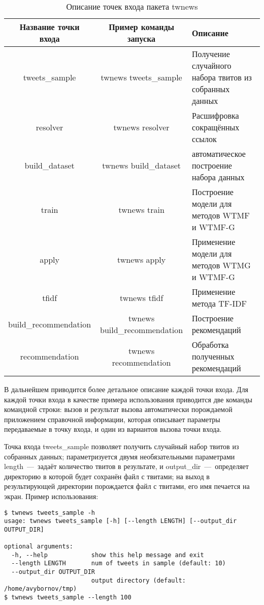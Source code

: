          \begin{table}[h!]
            \small
            \caption{Описание точек входа пакета twnews \bigskip}
            \center

            \label{tabular:entry_point}
            \begin{tabular}{|c|c|m{7cm}|}
                \hline
                \bf{Название точки входа} & \bf{Пример команды запуска} & \bf{Описание} \\ \hline
                tweets\_sample & twnews tweets\_sample & Получение случайного набора твитов из собранных данных \\ \hline
                resolver & twnews resolver & Расшифровка сокращённых ссылок \\ \hline
                build\_dataset & twnews build\_dataset & автоматическое построение набора данных \\ \hline
                train & twnews train & Построение модели для методов WTMF и WTMF-G \\ \hline
                apply & twnews apply & Применение модели для методов WTMG и WTMF-G \\ \hline
                tfidf & twnews tfidf & Применение метода TF-IDF \\ \hline
                build\_recommendation & twnews build\_recommendation & Построение рекомендаций \\ \hline
                recommendation & twnews recommendation & Обработка полученных рекомендаций \\ \hline
            \end{tabular}
        \end{table}
        В дальнейшем приводится более детальное описание каждой точки входа. Для каждой точки входа в качестве примера использования
        приводится две команды командной строки: вызов и результат вызова автоматически порождаемой приложением справочной информации,
        которая описывает параметры передаваемые в точку входа,
        и один из вариантов вызова точки входа.


        Точка входа tweets\_sample позволяет получить случайный набор твитов из собранных данных; параметризуется двумя необязательными параметрами
        length~---~задаёт количество твитов в результате, и output\_dir~---~определяет директорию в которой будет сохранён файл с твитами;
        на выход в результирующей директории порождается файл с твитами, его имя печается на экран. Пример использования:
        \begin{lstlisting}
$ twnews tweets_sample -h
usage: twnews tweets_sample [-h] [--length LENGTH] [--output_dir OUTPUT_DIR]

optional arguments:
  -h, --help            show this help message and exit
  --length LENGTH       num of tweets in sample (default: 10)
  --output_dir OUTPUT_DIR
                        output directory (default: /home/avybornov/tmp)
$ twnews tweets_sample --length 100
        \end{lstlisting}

